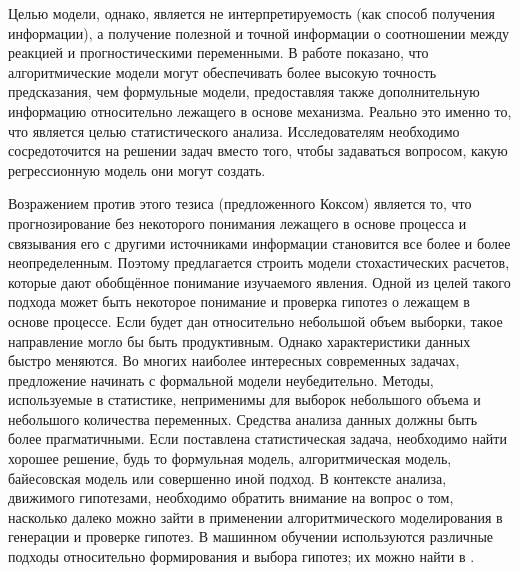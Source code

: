 Целью модели, однако, является не интерпретируемость (как способ получения информации), а получение полезной и точной 
информации о соотношении между реакцией и прогностическими переменными. В работе \cite{breiman2001statistical} 
показано, что алгоритмические модели могут обеспечивать более высокую точность предсказания, чем формульные модели, 
предоставляя также дополнительную информацию относительно лежащего в основе механизма. Реально это именно то, что 
является целью статистического анализа. Исследователям необходимо сосредоточится на решении задач вместо того, чтобы 
задаваться вопросом, какую регрессионную модель они могут создать. 

Возражением против этого тезиса (предложенного Коксом) является то, что прогнозирование без некоторого понимания 
лежащего в основе процесса и связывания его с другими источниками информации становится все более и более 
неопределенным. Поэтому предлагается строить модели стохастических расчетов, которые дают обобщённое понимание 
изучаемого явления. Одной из целей такого подхода может быть некоторое понимание и проверка гипотез о лежащем в основе 
процессе. Если будет дан относительно небольшой объем выборки, такое направление могло бы быть продуктивным. 
Однако характеристики данных быстро меняются. Во многих наиболее интересных современных задачах, предложение начинать 
с формальной модели неубедительно. Методы, используемые в статистике, неприменимы для выборок небольшого объема и 
небольшого количества переменных. Средства анализа данных должны быть более прагматичными. Если поставлена 
статистическая задача, необходимо найти хорошее решение, будь то формульная модель, алгоритмическая модель, 
байесовская модель или совершенно иной подход. В контексте анализа, движимого гипотезами, необходимо обратить внимание 
на вопрос о том, насколько далеко можно зайти в применении алгоритмического моделирования в генерации и проверке 
гипотез. В машинном обучении используются различные подходы относительно формирования и выбора гипотез; их можно найти 
в \cite{barber2012bayesian, breiman2001statistical, ivezic2019statistics}.

